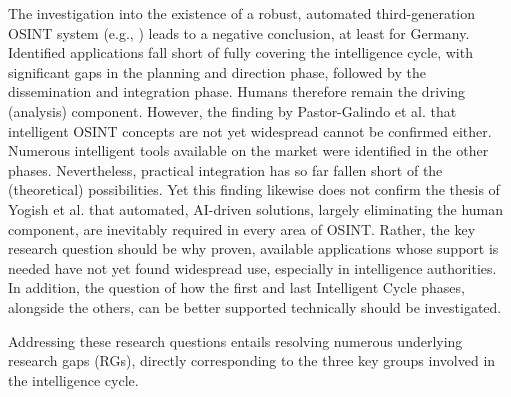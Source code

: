 \documentclass[10pt]{article}
\begin{document}
The investigation into the existence of a robust, automated third-generation OSINT system
(e.g., \cite{Ghioni.2023})
leads to a negative conclusion, at least for Germany. Identified applications fall short of fully covering
the intelligence cycle, with significant gaps in the planning and direction phase,
followed by the dissemination and integration phase. Humans therefore remain the driving (analysis)
component. However, the finding by Pastor-Galindo et al. \cite{PastorGalindo.2020} that intelligent OSINT
concepts are not yet widespread cannot be confirmed either. Numerous intelligent tools available
on the market were identified in the other phases. Nevertheless, practical integration has so far
fallen short of the (theoretical) possibilities. Yet this finding likewise does not confirm the
thesis of Yogish et al. \cite{Yogish.2021} that automated, AI-driven solutions, largely eliminating
the human component, are inevitably required in every area of OSINT. Rather, the key research
question should be why proven, available applications whose support is needed have not
yet found widespread use, especially in intelligence authorities. In addition, the question of how the
first and last Intelligent Cycle phases, alongside the others, can be better supported technically
should be investigated.

Addressing these research questions entails resolving numerous underlying research gaps (RGs), directly corresponding to the three key groups involved in the intelligence cycle.
\end{document}
